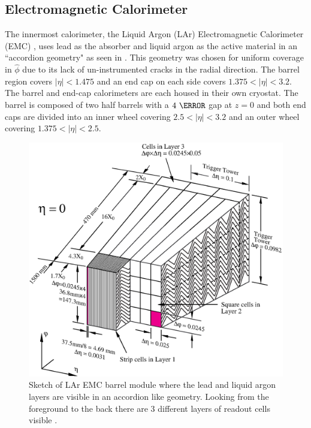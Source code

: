 \subsection{Electromagnetic Calorimeter}

The innermost calorimeter, the Liquid Argon (LAr) Electromagnetic Calorimeter
(EMC) \cite{PERF-2007-01}, uses lead as the absorber and liquid argon as the
active material in an ``accordion geometry" as seen in .
This geometry was chosen for uniform coverage in $\hat{\phi}$ due to its lack
of un-instrumented cracks in the radial direction.  The barrel region covers
$|\eta| < 1.475$ and an end cap on each side covers $1.375 < |\eta| < 3.2$. The
barrel and end-cap calorimeters are each housed in their own cryostat.  The
barrel is composed of two half barrels with a $4~\mm$ gap at $z = 0$ and both
end caps are divided into an inner wheel covering $2.5 < |\eta| < 3.2$ and an
outer wheel covering $1.375 < |\eta| < 2.5$.

\begin{figure}[!htbp]
  \begin{center}
    \includegraphics[width=0.8\linewidth]{figures/atlas/accordion}
    \caption{Sketch of LAr EMC barrel module where the lead and liquid argon
layers are visible in an accordion like geometry. Looking from the foreground
to the back there are 3 different layers of readout cells visible
\cite{PERF-2007-01}.}
    \label{fig:accordion}
  \end{center}
\end{figure}

